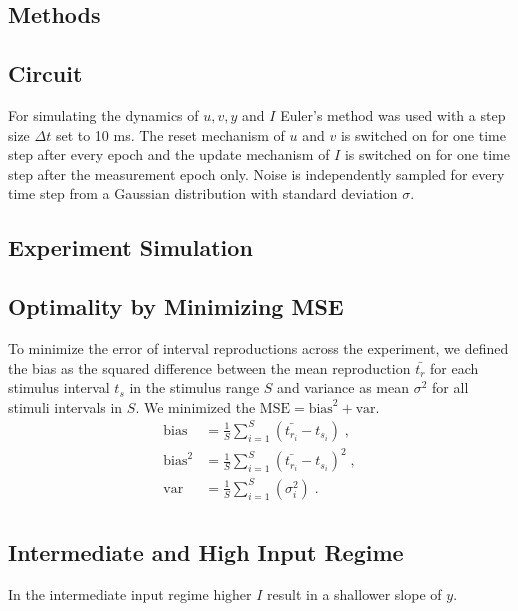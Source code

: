 \documentclass[10pt]{article}
\begin{document}
\subsection{Methods}
\subsection*{Circuit}
For simulating the dynamics of $u, v, y$ and $I$ Euler's method was used with a step size $\Delta t$ set to 10 ms.
The reset mechanism of $u$ and $v$ is switched on for one time step after every epoch and the update mechanism of $I$ is switched on for one time step after the measurement epoch only.
Noise is independently sampled for every time step from a Gaussian distribution with standard deviation $\sigma$.

\subsection*{Experiment Simulation}

\subsection*{Optimality by Minimizing MSE}
To minimize the error of interval reproductions across the experiment, we defined the bias as the squared difference between the mean reproduction $\bar{t_{r}}$ for each stimulus interval $t_s$ in the stimulus range $S$ and variance as mean $\sigma^2$ for all stimuli intervals in $S$. We minimized the $\text{MSE} = \text{bias}^2+\text{var}$.
\begin{equation} \label{MSE}
	\begin{split}
	 \text{bias} & = \frac{1}{S} \sum \limits_{i=1}^{S} (\bar{t_{r_i}} - t_{s_i}) \;,\\
	 \text{bias}^2 & = \frac{1}{S} \sum \limits_{i=1}^{S}(\bar{t_{r_i}} - t_{s_i})^2 \;,\\
	 \text{var} & = \frac{1}{S} \sum \limits_{i=1}^{S}(\sigma_i^2) \;.\\
	\end{split}
\end{equation}

\subsection{Intermediate and High Input Regime}
In the intermediate input regime higher $I$ result in a shallower slope of $y$.
\end{document}
